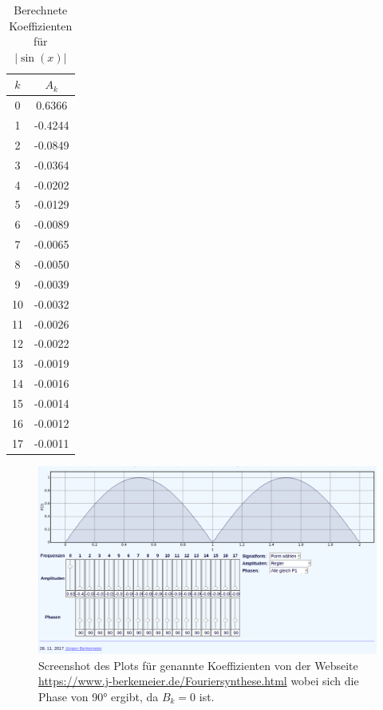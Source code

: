 \begin{table}
  \centering
  \caption{Berechnete Koeffizienten für $|\sin(x)|$}
  \label{tab:a_sin}
  \begin{tabular}{c c}
    \toprule 
    $k$ & $A_k$ \\ 
    \midrule 
    0 & 0.6366 \\
    1 & -0.4244 \\
    2 & -0.0849 \\
    3 & -0.0364 \\
    4 & -0.0202 \\
    5 & -0.0129 \\
    6 & -0.0089 \\
    7 & -0.0065 \\
    8 & -0.0050 \\
    9 & -0.0039 \\
    10 & -0.0032 \\
    11 & -0.0026 \\
    12 & -0.0022 \\
    13 & -0.0019 \\
    14 & -0.0016 \\
    15 & -0.0014 \\
    16 & -0.0012 \\
    17 & -0.0011 \\ 
    \bottomrule
  \end{tabular}
\end{table}

\begin{figure}
  \centering
  \includegraphics[width=\textwidth]{sin-plot.png}
  \caption{Screenshot des Plots für genannte Koeffizienten von der Webseite \href{https://www.j-berkemeier.de/Fouriersynthese.html}{https://www.j-berkemeier.de/Fouriersynthese.html} wobei sich die Phase von 90° ergibt, da $B_k=0$ ist.}
\end{figure}